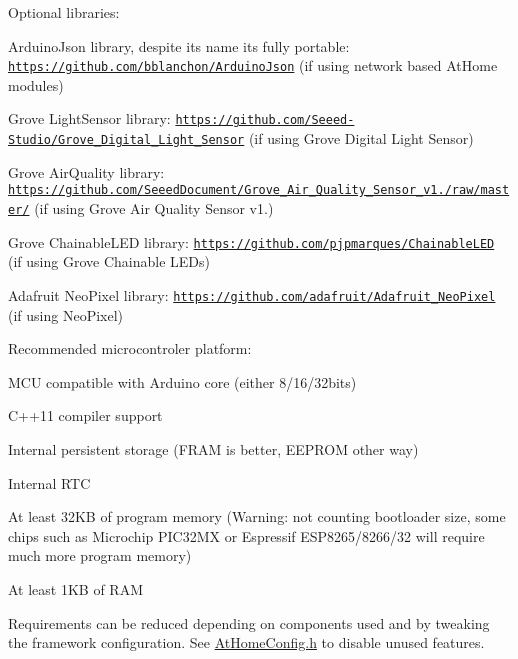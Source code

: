 Optional libraries\+:
\begin{DoxyItemize}
\item Arduino\+Json library, despite it\textquotesingle{}s name it\textquotesingle{}s fully portable\+: \href{https://github.com/bblanchon/ArduinoJson}{\tt https\+://github.\+com/bblanchon/\+Arduino\+Json} (if using network based At\+Home modules)
\item Grove Light\+Sensor library\+: \href{https://github.com/Seeed-Studio/Grove_Digital_Light_Sensor}{\tt https\+://github.\+com/\+Seeed-\/\+Studio/\+Grove\+\_\+\+Digital\+\_\+\+Light\+\_\+\+Sensor} (if using Grove Digital Light Sensor)
\item Grove Air\+Quality library\+: \href{https://github.com/SeeedDocument/Grove_Air_Quality_Sensor_v1.3/raw/master/}{\tt https\+://github.\+com/\+Seeed\+Document/\+Grove\+\_\+\+Air\+\_\+\+Quality\+\_\+\+Sensor\+\_\+v1./raw/master/} (if using Grove Air Quality Sensor v1.)
\item Grove Chainable\+L\+ED library\+: \href{https://github.com/pjpmarques/ChainableLED}{\tt https\+://github.\+com/pjpmarques/\+Chainable\+L\+ED} (if using Grove Chainable L\+E\+Ds)
\item Adafruit Neo\+Pixel library\+: \href{https://github.com/adafruit/Adafruit_NeoPixel}{\tt https\+://github.\+com/adafruit/\+Adafruit\+\_\+\+Neo\+Pixel} (if using Neo\+Pixel)
\end{DoxyItemize}

Recommended microcontroler platform\+:
\begin{DoxyItemize}
\item M\+CU compatible with Arduino core (either 8/16/32bits)
\item C++11 compiler support
\item Internal persistent storage (F\+R\+AM is better, E\+E\+P\+R\+OM other way)
\item Internal R\+TC
\item At least 32\+KB of program memory (Warning\+: not counting bootloader size, some chips such as Microchip P\+I\+C32\+MX or Espressif E\+S\+P8265/8266/32 will require much more program memory)
\item At least 1\+KB of R\+AM
\end{DoxyItemize}

Requirements can be reduced depending on components used and by tweaking the framework configuration. See \mbox{\hyperlink{_at_home_config_8h_source}{At\+Home\+Config.\+h}} to disable unused features.

